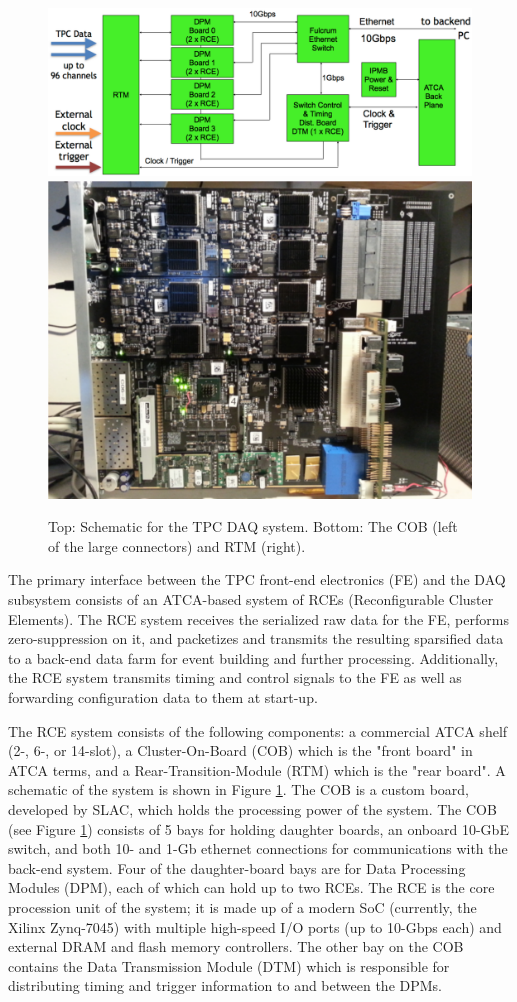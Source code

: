 \begin{figure}[htb]
\centering
\begin{minipage}[b]{1.0\textwidth}
\begin{center}
\includegraphics[width=1.0\textwidth]{figures/rce-block.pdf}
\includegraphics[width=.5\textwidth]{figures/COB-gen3.pdf}
\end{center}
\end{minipage}
\caption{Top: Schematic for the TPC DAQ system. Bottom: The COB (left of the large connectors) and RTM (right).}
\label{fig:rce}
\end{figure}

The primary interface between the TPC front-end electronics (FE) and the DAQ subsystem consists of an ATCA-based system of
RCEs (Reconfigurable Cluster Elements).
The RCE system receives the serialized raw data for the FE, performs zero-suppression on it,
and packetizes and transmits the resulting sparsified data to a back-end data farm for event building and further processing.
Additionally, the RCE system transmits timing and control signals to the FE as well as forwarding configuration data
to them at start-up.     

The RCE system consists of the following components:
a commercial ATCA shelf (2-, 6-, or 14-slot), a Cluster-On-Board (COB) which is the "front board" in ATCA terms,
and a Rear-Transition-Module (RTM) which is the "rear board".
A schematic of the system is shown in Figure \ref{fig:rce}.
The COB is a custom board, developed by SLAC, which holds the processing power of the system.
The COB (see Figure \ref{fig:rce}) consists of 5 bays for holding daughter boards, an onboard 10-GbE switch,
and both 10- and 1-Gb ethernet connections for communications with the back-end system.
Four of the daughter-board bays are for Data Processing Modules (DPM), each of which can hold up to two RCEs.
The RCE is the core procession unit of the system; it is made up of a modern SoC (currently, the Xilinx Zynq-7045)
with multiple high-speed I/O ports (up to 10-Gbps each) and external DRAM and flash memory controllers.
The other bay on the COB contains the Data Transmission Module (DTM) which is responsible
for distributing timing and trigger information to and between the DPMs.  

